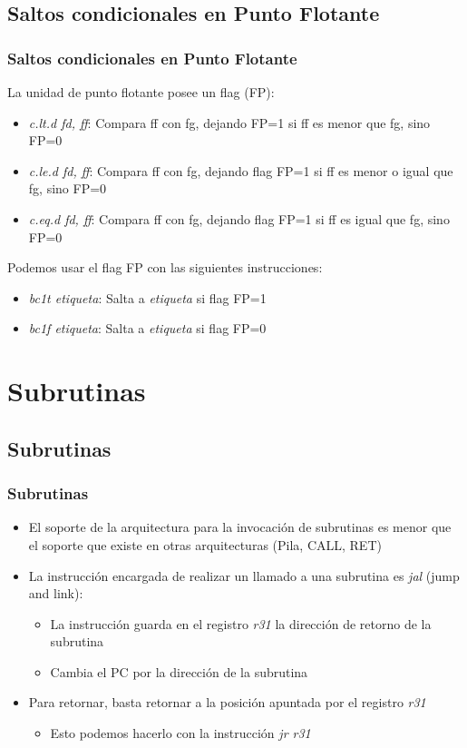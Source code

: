 \documentclass{beamer}
\begin{document}
\subsection{Saltos condicionales en Punto Flotante}

\begin{frame}
\frametitle{Saltos condicionales en Punto Flotante}
La unidad de punto flotante posee un flag (FP):
\begin{itemize}
\item \emph{c.lt.d fd, ff}: Compara ff con fg, dejando FP=1 si ff es menor que fg, sino FP=0
\item \emph{c.le.d fd, ff}: Compara ff con fg, dejando flag FP=1 si ff es menor o igual que fg, sino FP=0
\item \emph{c.eq.d fd, ff}: Compara ff con fg, dejando flag FP=1 si ff es igual que fg, sino FP=0
\end{itemize}

Podemos usar el flag FP con las siguientes instrucciones:
\begin{itemize}
\item \emph{bc1t etiqueta}: Salta a \emph{etiqueta} si flag FP=1 
\item \emph{bc1f etiqueta}: Salta a \emph{etiqueta} si flag FP=0
\end{itemize}
\end{frame}


\section{Subrutinas}
\subsection{Subrutinas}
\begin{frame}
\frametitle{Subrutinas}
\begin{itemize}
\item El soporte de la arquitectura para la invocación de subrutinas es menor que el soporte que existe en otras arquitecturas (Pila, CALL, RET)
\item La instrucción encargada de realizar un llamado a una subrutina es \emph{jal} (jump and link):
\begin{itemize}
\item La instrucción guarda en el registro \emph{r31} la dirección de retorno de la subrutina
\item Cambia el PC por la dirección de la subrutina
\end{itemize}
\item Para retornar, basta retornar a la posición apuntada por el registro \emph{r31}
\begin{itemize}
\item Esto podemos hacerlo con la instrucción \emph{jr r31}
\end{itemize}
\end{itemize}
\end{frame}
\end{document}
